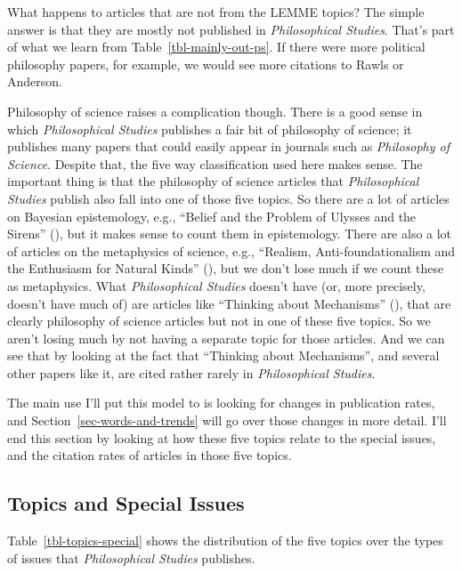 \documentclass[
  10pt,
  letterpaper,
  DIV=11,
  numbers=noendperiod,
  twoside]{scrartcl}
\begin{document}
What happens to articles that are not from the LEMME topics? The simple
answer is that they are mostly not published in \emph{Philosophical
Studies}. That's part of what we learn from
Table~\ref{tbl-mainly-out-ps}. If there were more political philosophy
papers, for example, we would see more citations to Rawls or Anderson.

Philosophy of science raises a complication though. There is a good
sense in which \emph{Philosophical Studies} publishes a fair bit of
philosophy of science; it publishes many papers that could easily appear
in journals such as \emph{Philosophy of Science}. Despite that, the five
way classification used here makes sense. The important thing is that
the philosophy of science articles that \emph{Philosophical Studies}
publish also fall into one of those five topics. So there are a lot of
articles on Bayesian epistemology, e.g., ``Belief and the Problem of
Ulysses and the Sirens'' (), but it makes sense to count them in epistemology. There are also
a lot of articles on the metaphysics of science, e.g., ``Realism,
Anti-foundationalism and the Enthusiasm for Natural Kinds''
(), but we don't lose much
if we count these as metaphysics. What \emph{Philosophical Studies}
doesn't have (or, more precisely, doesn't have much of) are articles
like ``Thinking about Mechanisms''
(),
that are clearly philosophy of science articles but not in one of these
five topics. So we aren't losing much by not having a separate topic for
those articles. And we can see that by looking at the fact that
``Thinking about Mechanisms'', and several other papers like it, are
cited rather rarely in \emph{Philosophical Studies}.

The main use I'll put this model to is looking for changes in
publication rates, and Section~\ref{sec-words-and-trends} will go over
those changes in more detail. I'll end this section by looking at how
these five topics relate to the special issues, and the citation rates
of articles in those five topics.

\subsection{Topics and Special Issues}\label{topics-and-special-issues}

Table~\ref{tbl-topics-special} shows the distribution of the five topics
over the types of issues that \emph{Philosophical Studies} publishes.
\end{document}
